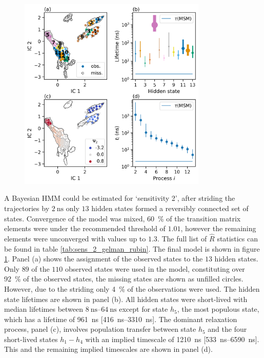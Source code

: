 \begin{figure}
    \centering
    \label{fig:sensitivity_2_bhmm}
    \includegraphics[width=0.8\textwidth]{chapters/aadh/figures/sensitivity_2_hmm.png}
\end{figure}


A Bayesian HMM could be estimated for `sensitivity 2', after striding the trajectories by $\SI{2}{\nano\second}$  only $13$ hidden states formed a reversibly connected set of states. Convergence of the model was mixed, \SI{60}{\percent} of the transition matrix elements were under the recommended threshold of $1.01$,  however the remaining elements were unconverged with values up to $1.3$. The full list of $\hat{R}$ statistics can be found in table \ref{tab:sens_2_gelman_rubin}. The final model is shown in figure \ref{fig:sensitivity_2_bhmm}. Panel (a) shows the assignment of the observed states to the $13$ hidden states. Only $89$ of the $110$ observed states were used in the model, constituting over \SI{92}{\percent} of the observed states, the missing states are shown as unfilled circles. However, due to the striding only \SI{4}{\percent} of the observations were used. The hidden state lifetimes are shown in panel (b). All hidden states were short-lived with median lifetimes between $\SIrange{8}{64}{\nano\second}$ except for state $h_5$, the most populous state, which has a lifetime of \SI{961}{\nano\second} [\SIrange[range-phrase=-]{416}{3310}{\nano\second}]. The dominant relaxation process, panel (c), involves population transfer between state $h_{5}$ and the four short-lived states $h_{1} - h_{4}$ with an implied timescale of \SI{1210}{\nano\second} [\SIrange[range-phrase=-]{533}{6590}{\nano\second}]. This and the remaining implied timescales are shown in panel (d). 

